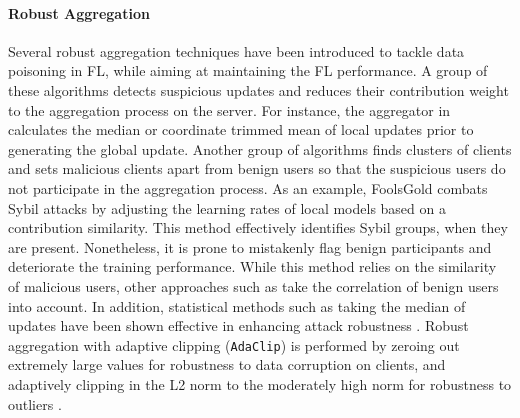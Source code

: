 



\paragraph{Robust Aggregation}
Several robust aggregation techniques have been introduced to tackle data poisoning in FL, while aiming at maintaining the FL performance. A group of these algorithms detects suspicious updates and reduces their contribution weight to the aggregation process on the server. For instance, the aggregator in \cite{pmlr-v80-yin18a} calculates the median or coordinate trimmed mean of local updates prior to generating the global update. Another group of algorithms finds clusters of clients and sets malicious clients apart from benign users so that the suspicious users do not participate in the aggregation process. As an example, FoolsGold \cite{259745} combats Sybil attacks by adjusting the learning rates of local models based on a contribution similarity. This method effectively identifies Sybil groups, when they are present. Nonetheless, it is prone to mistakenly flag benign participants and deteriorate the training performance. While this method relies on the similarity of malicious users, other approaches such as \cite{NIPS2017_f4b9ec30, pmlr-v80-mhamdi18a} take the correlation of benign users into account. In addition, statistical methods such as taking the median of updates have been shown effective in enhancing attack robustness \cite{9721118}. Robust aggregation with adaptive clipping (\verb+AdaClip+) is performed by zeroing out extremely large values for robustness to data corruption on clients, and adaptively clipping in the L2 norm to the moderately high norm for robustness to outliers \cite{NEURIPS2021_91cff01a}.

